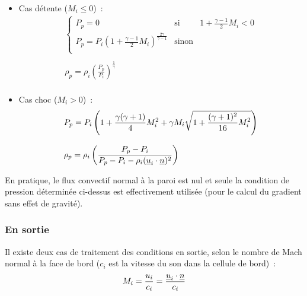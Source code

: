 \begin{enumerate}
\begin{itemize}
\item Cas détente ($M_i \leqslant 0$)~:\\
$$
\begin{array}{l}
\left\{\begin{array}{lll}
P_p=0 & \text{si} & 1 + \displaystyle\frac{\gamma-1}{2}M_i<0\\
P_p = P_i \left(1 + \displaystyle\frac{\gamma-1}{2}M_i\right)
^{\frac{2\gamma}{\gamma-1}} & \text{sinon}\\
\end{array}\right.\\
\\
\rho_p=\rho_i \left(\displaystyle\frac{P_p}{P_i}\right)^{\frac{1}{\gamma}}\\
\end{array}
$$

\item Cas choc ($M_i > 0$)~:\\
$$
\begin{array}{l}
P_p = P_i \left(1 + \displaystyle\frac{\gamma(\gamma+1)}{4}M_i^2
+\gamma M_i \displaystyle\sqrt{1+\displaystyle\frac{(\gamma+1)^2}{16}M_i^2}\right)
\\
\\
\rho_p=\rho_i \left(\displaystyle\frac{P_p-P_i}
{P_p-P_i-\rho_i (\underline{u}_i \cdot \underline{n})^2}\right)\\
\end{array}
$$

\end{itemize}

\end{enumerate}

En pratique, le flux convectif normal à la paroi est nul et seule
la condition de pression déterminée ci-dessus est effectivement
utilisée (pour le calcul du gradient sans effet de gravité).

\subsubsection*{En sortie}

Il existe deux cas de traitement des conditions en sortie,
selon le nombre de Mach normal à la face de bord
($c_i$ est la vitesse du son dans la cellule de bord)~:
$$M_i = \displaystyle\frac{u_i}{c_i}
= \displaystyle\frac{\underline{u}_i \cdot \underline{n}}{c_i}$$

